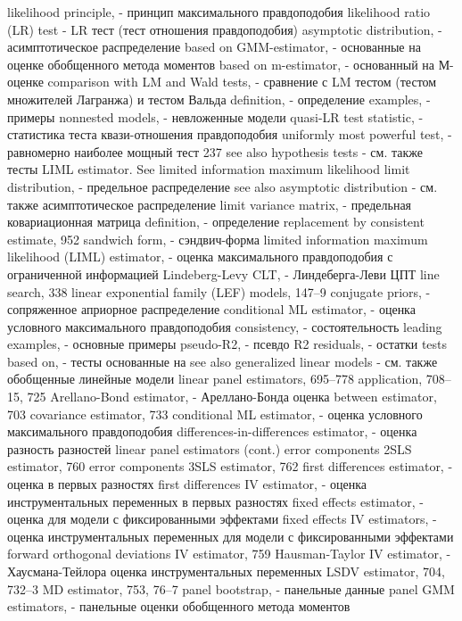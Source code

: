 likelihood principle, - принцип максимального правдоподобия
likelihood ratio (LR) test - LR тест (тест отношения правдоподобия)
asymptotic distribution, - асимптотическое распределение
based on GMM-estimator, - основанные на оценке обобщенного метода моментов
based on m-estimator, - основанный на М-оценке
comparison with LM and Wald tests, - сравнение с LM тестом (тестом множителей Лагранжа) и тестом Вальда
definition, - определение
examples, - примеры
nonnested models, - невложенные модели
quasi-LR test statistic, - статистика теста квази-отношения правдоподобия
uniformly most powerful test, - равномерно наиболее мощный тест
237 see also hypothesis tests - см. также тесты 
LIML estimator. See limited information maximum likelihood
limit distribution, - предельное распределение
see also asymptotic distribution - см. также асимптотическое распределение
limit variance matrix, - предельная ковариационная матрица
definition, - определение
replacement by consistent estimate, 952 
sandwich form, - сэндвич-форма
limited information maximum likelihood (LIML) estimator, - оценка максимального правдоподобия с ограниченной информацией
Lindeberg-Levy CLT, - Линдеберга-Леви ЦПТ
line search, 338
linear exponential family (LEF) models, 147–9
conjugate priors, - сопряженное априорное распределение
conditional ML estimator, - оценка условного максимального правдоподобия
consistency, - состоятельность
leading examples, - основные примеры
pseudo-R2, - псевдо R2
residuals, - остатки
tests based on, - тесты основанные на
see also generalized linear models - см. также обобщенные линейные модели
linear panel estimators, 695–778
application, 708–15, 725
Arellano-Bond estimator, - Ареллано-Бонда оценка
between estimator, 703
covariance estimator, 733
conditional ML estimator, - оценка условного максимального правдоподобия
differences-in-differences estimator, - оценка разность разностей
linear panel estimators (cont.)
error components 2SLS estimator, 760
error components 3SLS estimator, 762
first differences estimator, - оценка в первых разностях
first differences IV estimator, - оценка инструментальных переменных в первых разностях
fixed effects estimator, - оценка для модели с фиксированными эффектами
fixed effects IV estimators, - оценка инструментальных переменных для модели с фиксированными эффектами
forward orthogonal deviations IV estimator, 759 
Hausman-Taylor IV estimator, - Хаусмана-Тейлора оценка инструментальных переменных
LSDV estimator, 704, 732–3
MD estimator, 753, 76–7
panel bootstrap, - панельные данные
panel GMM estimators, - панельные оценки обобщенного метода моментов
